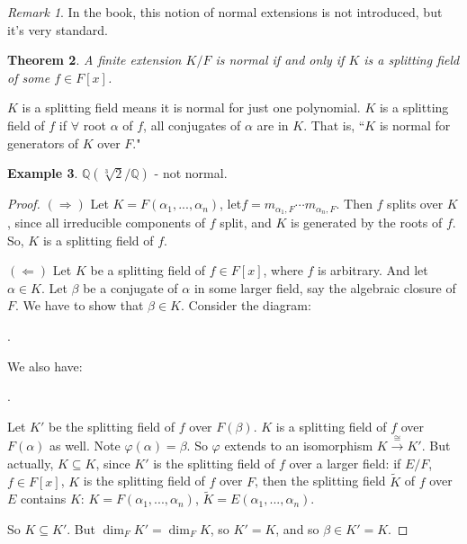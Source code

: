 \documentclass[9pt,reqno,twoside]{amsbook}
\theoremstyle{plain}
\newtheorem{theorem}{Theorem}[chapter]
\numberwithin{section}{chapter}
\numberwithin{equation}{chapter}
\theoremstyle{definition}
\newtheorem{Ex}[theorem]{Example}
\theoremstyle{remark}
\newtheorem{rem}[theorem]{Remark}
\theoremstyle{plain}
\newcommand{\sub}{\subseteq}
\newcommand{\Q}{\mathbb{Q}}
\renewcommand{\phi}{\varphi}
\begin{document}
\begin{rem}
In the book, this notion of normal extensions is not introduced, but it's very standard. 
\end{rem}


\begin{theorem}
A finite extension $K/F$ is normal if and only if $K$ is a splitting field of some $f \in F[x]$. 
\end{theorem}

$K$ is a splitting field means it is normal for just one polynomial. $K$ is a splitting field of $f$ if $\forall$ root $\alpha$ of $f$, all conjugates of $\alpha$ are in $K$. That is, ``$K$ is normal for generators of $K$ over $F$."

\begin{Ex}
$\Q(\sqrt[3]{2}/\Q)$ - not normal. 
\end{Ex} 

\begin{proof}
\textbf{$(\Rightarrow)$} Let $K = F(\alpha_1,...,\alpha_n)$, let$f = m_{\alpha_1,F}\cdots m_{\alpha_n,F}$. Then $f$ splits over $K$, since all irreducible components of $f$ split, and $K$ is generated by the roots of $f$. So, $K$ is a splitting field of $f$. 

\textbf{$(\Leftarrow)$} Let $K$ be a splitting field of $f \in F[x]$, where $f$ is arbitrary. And let $\alpha \in K$. Let $\beta$ be a conjugate of $\alpha$ in some larger field, say the algebraic closure of $F$. We have to show that $\beta \in K$. Consider the diagram:
\begin{center}
.
\end{center}
We also have:
\begin{center}
.
\end{center}
Let $K'$ be the splitting field of $f$ over $F(\beta)$. $K$ is a splitting field of $f$ over $F(\alpha)$ as well. Note $\phi(\alpha) = \beta$. So $\phi$ extends to an isomorphism $K \overset{\cong}{\to} K'$. But actually, $K \sub K$, since $K'$ is the splitting field of $f$ over a larger field: if $E/F$, $f \in F[x]$, $K$ is the splitting field of $f$ over $F$, then the splitting field $\tilde{K}$ of $f$ over $E$ contains $K$: $K = F(\alpha_1,...,\alpha_n)$, $\tilde{K} = E(\alpha_1,...,\alpha_n)$. 

So $K \sub K'$. But $\dim_F K' = \dim_F K$, so $K' = K$, and so $\beta \in K' = K$. 
\end{proof}
\end{document}
